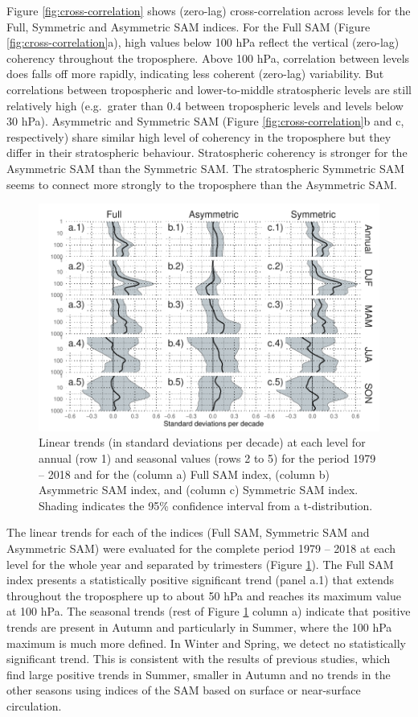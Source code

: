 \documentclass[smallextended]{svjour3}       %
\begin{document}
Figure \ref{fig:cross-correlation} shows (zero-lag) cross-correlation across levels for the Full, Symmetric and Asymmetric SAM indices. For the Full SAM (Figure \ref{fig:cross-correlation}a), high values below 100 hPa reflect the vertical (zero-lag) coherency throughout the troposphere. Above 100 hPa, correlation between levels does falls off more rapidly, indicating less coherent (zero-lag) variability. But correlations between tropospheric and lower-to-middle stratospheric levels are still relatively high (e.g.~grater than 0.4 between tropospheric levels and levels below 30 hPa). Asymmetric and Symmetric SAM (Figure \ref{fig:cross-correlation}b and c, respectively) share similar high level of coherency in the troposphere but they differ in their stratospheric behaviour. Stratospheric coherency is stronger for the Asymmetric SAM than the Symmetric SAM. The stratospheric Symmetric SAM seems to connect more strongly to the troposphere than the Asymmetric SAM.

\begin{figure}
\includegraphics{trends-1} \caption{Linear trends (in standard deviations per decade) at each level for annual (row 1) and seasonal values (rows 2 to 5) for the period 1979 -- 2018 and for the (column a) Full SAM index, (column b) Asymmetric SAM index, and (column c) Symmetric SAM index. Shading indicates the 95\% confidence interval from a t-distribution.}\label{fig:trends}
\end{figure}

The linear trends for each of the indices (Full SAM, Symmetric SAM and Asymmetric SAM) were evaluated for the complete period 1979 -- 2018 at each level for the whole year and separated by trimesters (Figure \ref{fig:trends}). The Full SAM index presents a statistically positive significant trend (panel a.1) that extends throughout the troposphere up to about 50 hPa and reaches its maximum value at 100 hPa. The seasonal trends (rest of Figure \ref{fig:trends} column a) indicate that positive trends are present in Autumn and particularly in Summer, where the 100 hPa maximum is much more defined. In Winter and Spring, we detect no statistically significant trend. This is consistent with the results of previous studies, which find large positive trends in Summer, smaller in Autumn and no trends in the other seasons \citep[e.g.][ and references therein]{fogt2020} using indices of the SAM based on surface or near-surface circulation.
\end{document}
